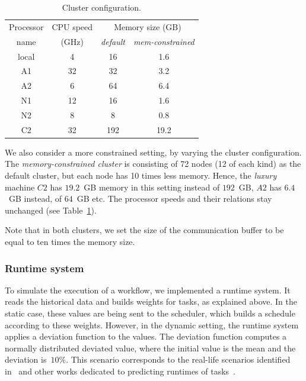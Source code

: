 \documentclass[conference]{IEEEtran}
\begin{document}
    \begin{table}[htb]
        \begin{center}
            \begin{tabular}{c|c|cc}
                \toprule
                Processor  %
                &  CPU speed   & \multicolumn{2}{c}{Memory size (GB)} \\
                name & (GHz) & {\em default} & {\em mem-constrained} \\
                \midrule
                local                    & 4                    & 16     & 1.6 \\
                A1                      & 32                   & 32     & 3.2 \\
                A2                      & 6                    & 64    & 6.4 \\
                N1                      & 12                   & 16     & 1.6 \\
                N2                      & 8                    & 8      & 0.8\\
                C2                      & 32                   & 192   &  19.2\\
                \bottomrule
            \end{tabular}
        \end{center}
        \caption{Cluster configuration.}
        \label{tab:procs}
    \end{table}

    We also consider a more constrained setting, by varying the cluster configuration. The
     {\em memory-constrained cluster} is consisting of 72 nodes (12 of each kind) as the default cluster,
     but each node has 10 times less memory. Hence,  
     the {\em luxury} machine $C2$ has $19.2$~GB memory in this setting instead of $192$~GB, 
     $A2$ has $6.4$~GB instead, of $64$~GB etc.
    The processor speeds and their relations stay unchanged (see Table~\ref{tab:procs}).

Note that in both clusters, we set the size of the communication buffer to be equal
to ten times the memory size.

    \subsubsection{Runtime system}

    To simulate the execution of a workflow, we implemented a runtime system.
    It reads the historical data and builds weights for tasks, as explained above.
    In the static case, these values are being sent to the scheduler, which builds a schedule
    according to these weights.
    However, in the dynamic setting, the runtime system applies a deviation function to the values.
    The deviation function computes a normally distributed deviated value, where the initial value
    is the mean and the deviation is~$10\%$.
    This scenario corresponds to the real-life scenarios identified in~\cite{lotaru} and
    other works dedicated to predicting runtimes of tasks~\cite{da2015online,da2013toward}.
\end{document}

